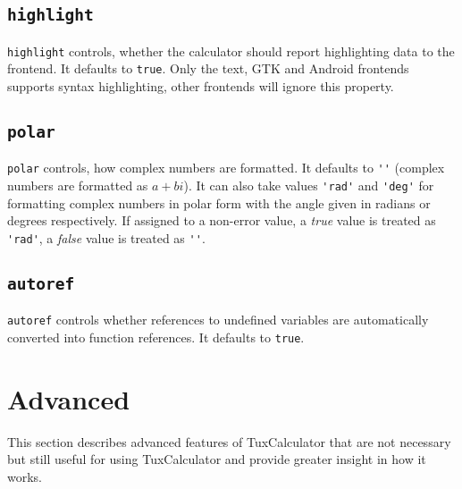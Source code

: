 \documentclass[10pt]{article}
\begin{document}
    \subsection{\texttt{highlight}}\label{subsec:highlight}
    \verb|highlight| controls, whether the calculator should report highlighting data to the frontend.
    It defaults to \verb|true|.
    Only the text, GTK and Android frontends supports syntax highlighting, other frontends will ignore this property.
    
    \subsection{\texttt{polar}}\label{subsec:polar}
    \verb|polar| controls, how complex numbers are formatted.
    It defaults to \verb|''| (complex numbers are formatted as $ a + bi $).
    It can also take values \verb|'rad'| and \verb|'deg'| for formatting complex numbers in polar form with the angle given in radians or degrees respectively.
    If assigned to a non-error value, a \textsl{true} value is treated as \verb|'rad'|, a \textsl{false} value is treated as \verb|''|.
    
    \subsection{\texttt{autoref}}\label{subsec:autoref}
    \verb|autoref| controls whether references to undefined variables are automatically converted into function references.
    It defaults to \verb|true|.
    
    \section{Advanced}\label{sec:advanced}
    This section describes advanced features of TuxCalculator that are not necessary but still useful for using TuxCalculator and provide greater insight in how it works.
    
\end{document}
